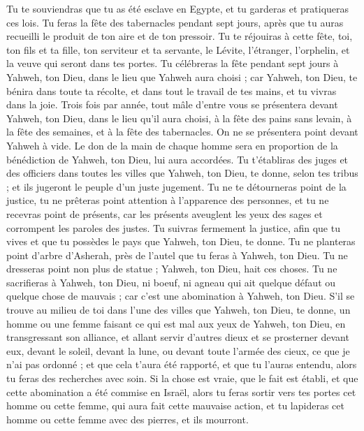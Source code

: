 \begin{multicols}{2}
Tu te souviendras que tu as été esclave en Egypte, et tu garderas et pratiqueras ces lois.
Tu feras la fête des tabernacles pendant sept jours, après que tu auras recueilli le produit de ton aire et de ton pressoir.
Tu te réjouiras à cette fête, toi, ton fils et ta fille, ton serviteur et ta servante, le Lévite, l'étranger, l'orphelin, et la veuve qui seront dans tes portes.
Tu célébreras la fête pendant sept jours à Yahweh, ton Dieu, dans le lieu que Yahweh aura choisi ; car Yahweh, ton Dieu, te bénira dans toute ta récolte, et dans tout le travail de tes mains, et tu vivras dans la joie.
Trois fois par année, tout mâle d'entre vous se présentera devant Yahweh, ton Dieu, dans le lieu qu'il aura choisi, à la fête des pains sans levain, à la fête des semaines, et à la fête des tabernacles. On ne se présentera point devant Yahweh à vide.
Le don de la main de chaque homme sera en proportion de la bénédiction de Yahweh, ton Dieu, lui aura accordées.
Tu t'établiras des juges et des officiers dans toutes les villes que Yahweh, ton Dieu, te donne, selon tes tribus ; et ils jugeront le peuple d’un juste jugement.
Tu ne te détourneras point de la justice, tu ne prêteras point attention à l'apparence des personnes, et tu ne recevras point de présents, car les présents aveuglent les yeux des sages et corrompent les paroles des justes.
Tu suivras fermement la justice, afin que tu vives et que tu possèdes le pays que Yahweh, ton Dieu, te donne.
Tu ne planteras point d’arbre d’Asherah\FTNT{}, près de l'autel que tu feras à Yahweh, ton Dieu.
Tu ne dresseras point non plus de statue ; Yahweh, ton Dieu, hait ces choses.
\VerseOne{}Tu ne sacrifieras à Yahweh, ton Dieu, ni boeuf, ni agneau qui ait quelque défaut ou quelque chose de mauvais ; car c'est une abomination à Yahweh, ton Dieu.
S’il se trouve au milieu de toi dans l’une des villes que Yahweh, ton Dieu, te donne, un homme ou une femme faisant ce qui est mal aux yeux de Yahweh, ton Dieu, en transgressant son alliance,
et allant servir d'autres dieux et se prosterner devant eux, devant le soleil, devant la lune, ou devant toute l'armée des cieux, ce que je n'ai pas ordonné ;
et que cela t'aura été rapporté, et que tu l’auras entendu, alors tu feras des recherches avec soin. Si la chose est vraie, que le fait est établi, et que cette abomination a été commise en Israël,
alors tu feras sortir vers tes portes cet homme ou cette femme, qui aura fait cette mauvaise action, et tu lapideras cet homme ou cette femme avec des pierres, et ils mourront.

\end{multicols}
